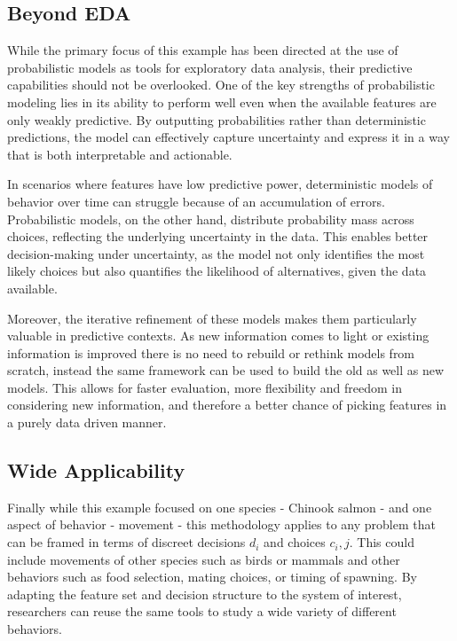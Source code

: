 \documentclass[11pt]{article}
\begin{document}
\subsection*{Beyond EDA}

While the primary focus of this example has been directed at the use of probabilistic models as tools for exploratory data analysis, their predictive capabilities should not be overlooked. One of the key strengths of probabilistic modeling lies in its ability to perform well even when the available features are only weakly predictive. By outputting probabilities rather than deterministic predictions, the model can effectively capture uncertainty and express it in a way that is both interpretable and actionable.

In scenarios where features have low predictive power, deterministic models of behavior over time can struggle because of an accumulation of errors. Probabilistic models, on the other hand, distribute probability mass across choices, reflecting the underlying uncertainty in the data. This enables better decision-making under uncertainty, as the model not only identifies the most likely choices but also quantifies the likelihood of alternatives, given the data available.

Moreover, the iterative refinement of these models makes them particularly valuable in predictive contexts. As new information comes to light or existing information is improved there is no need to rebuild or rethink models from scratch, instead the same framework can be used to build the old as well as new models. This allows for faster evaluation, more flexibility and freedom in considering new information, and therefore a better chance of picking features in a purely data driven manner. 

\subsection*{Wide Applicability}

Finally while this example focused on one species - Chinook salmon - and one aspect of behavior - movement - this methodology applies to any problem that can be framed in terms of discreet decisions $d_i$ and choices $c_i,j$. This could include movements of other species such as birds or mammals and other behaviors such as food selection, mating choices, or timing of spawning. By adapting the feature set and decision structure to the system of interest, researchers can reuse the same tools to study a wide variety of different behaviors. 
\end{document}
